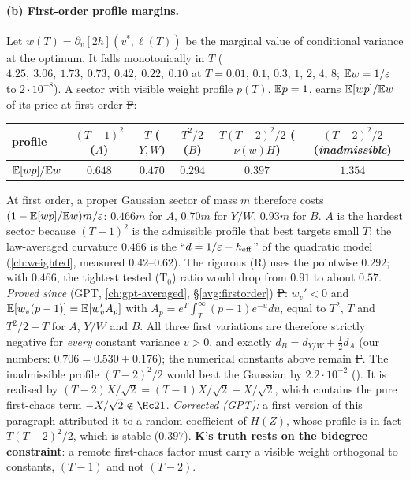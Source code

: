 \paragraph{(b) First-order profile margins.} Let $w(T)=\partial_v[2h](v^*,\ell(T))$ be the marginal value of conditional variance at the optimum. It falls monotonically in $T$
($4.25,\ 3.06,\ 1.73,\ 0.73,\ 0.42,\ 0.22,\ 0.10$ at $T=0.01,\,0.1,\,0.3,\,1,\,2,\,4,\,8$; $\mathbb E w=1/\varepsilon$ to $2\cdot10^{-8}$). A sector with visible weight profile $p(T)$, $\mathbb E p=1$, earns
$\mathbb E[wp]/\mathbb E w$ of its price at first order \st{F}:
\begin{center}\small
\begin{tabular}{lccccc}\toprule
profile & $(T-1)^2$ ($A$) & $T$ ($Y,W$) & $T^2/2$ ($B$) & $T(T-2)^2/2$ ($\nu(w)H$) & $(T-2)^2/2$ (\emph{inadmissible})\\\midrule
$\mathbb E[wp]/\mathbb E w$ & $0.648$ & $0.470$ & $0.294$ & $0.397$ & $1.354$\\\bottomrule
\end{tabular}
\end{center}
At first order, a proper Gaussian sector of mass $m$ therefore costs $(1-\mathbb E[wp]/\mathbb E w)m/\varepsilon$: $0.466m$ for $A$, $0.70m$ for $Y/W$, $0.93m$ for $B$. $A$ is the hardest sector
because $(T-1)^2$ is the admissible profile that best targets small $T$; the law-averaged curvature $0.466$ is the ``$d=1/\varepsilon-h_{\rm eff}$'' of the quadratic model (\autoref{ch:weighted},
measured $0.42$--$0.62$). The rigorous (R) uses the pointwise $0.292$; with $0.466$, the tightest tested (T$_0$) ratio would drop from $0.91$ to about $0.57$. \emph{Proved since} (GPT, \autoref{ch:gpt-averaged}, \S\ref{avg:firstorder}) \st{P}: $w_v'<0$ and $\mathbb E[w_v(p-1)]=\mathbb E[w_v'A_p]$ with $A_p=e^T\int_T^\infty(p-1)e^{-u}du$, equal to
$T^2$, $T$ and $T^2/2+T$ for $A$, $Y/W$ and $B$. All three first variations are therefore strictly negative for \emph{every} constant variance $v>0$, and exactly $d_B=d_{Y/W}+\tfrac12d_A$
(our numbers: $0.706=0.530+0.176$); the numerical constants above remain \st{F}. The inadmissible profile $(T-2)^2/2$ would beat the Gaussian by $2.2\cdot10^{-2}$ (). It
is realised by $(T-2)X/\sqrt2=(T-1)X/\sqrt2-X/\sqrt2$, which contains the pure first-chaos term $-X/\sqrt2\notin\Hc21$. \emph{Corrected (GPT):} a first version of this paragraph
attributed it to a random coefficient of $H(Z)$, whose profile is in fact $T(T-2)^2/2$, which is stable ($0.397$). \textbf{K's truth rests on the bidegree constraint}: a remote first-chaos
factor must carry a visible weight orthogonal to constants, $(T-1)$ and not $(T-2)$.

